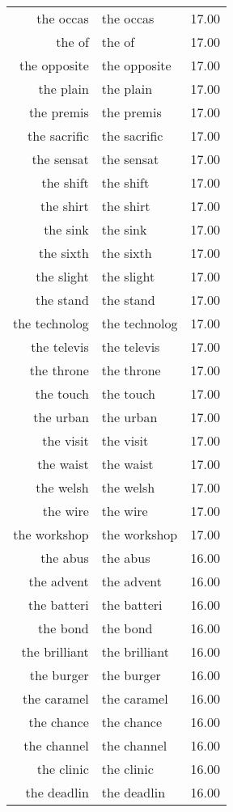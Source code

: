 \begin{table}[ht]
\begin{tabular}{rlr}
  the occas & the occas & 17.00 \\ 
  the of & the of & 17.00 \\ 
  the opposite & the opposite & 17.00 \\ 
  the plain & the plain & 17.00 \\ 
  the premis & the premis & 17.00 \\ 
  the sacrific & the sacrific & 17.00 \\ 
  the sensat & the sensat & 17.00 \\ 
  the shift & the shift & 17.00 \\ 
  the shirt & the shirt & 17.00 \\ 
  the sink & the sink & 17.00 \\ 
  the sixth & the sixth & 17.00 \\ 
  the slight & the slight & 17.00 \\ 
  the stand & the stand & 17.00 \\ 
  the technolog & the technolog & 17.00 \\ 
  the televis & the televis & 17.00 \\ 
  the throne & the throne & 17.00 \\ 
  the touch & the touch & 17.00 \\ 
  the urban & the urban & 17.00 \\ 
  the visit & the visit & 17.00 \\ 
  the waist & the waist & 17.00 \\ 
  the welsh & the welsh & 17.00 \\ 
  the wire & the wire & 17.00 \\ 
  the workshop & the workshop & 17.00 \\ 
  the abus & the abus & 16.00 \\ 
  the advent & the advent & 16.00 \\ 
  the batteri & the batteri & 16.00 \\ 
  the bond & the bond & 16.00 \\ 
  the brilliant & the brilliant & 16.00 \\ 
  the burger & the burger & 16.00 \\ 
  the caramel & the caramel & 16.00 \\ 
  the chance & the chance & 16.00 \\ 
  the channel & the channel & 16.00 \\ 
  the clinic & the clinic & 16.00 \\ 
  the deadlin & the deadlin & 16.00 \\ 

\end{tabular}
\end{table}
